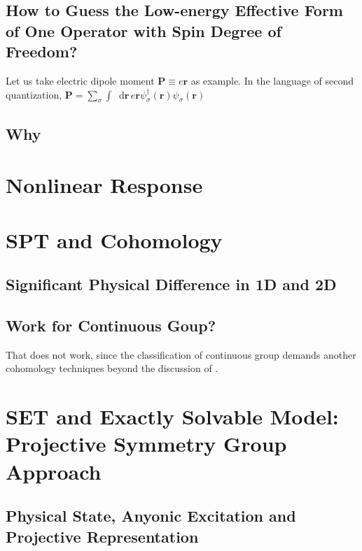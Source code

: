 \documentclass[10pt,nofootinbib]{revtex4}
\newcommand*\dd{\mathop{}\!\mathrm{d}}
\begin{document}
	\subsection{How to Guess the Low-energy Effective Form of One Operator with Spin Degree of Freedom?}
		Let us take electric dipole moment $\bm{P}\equiv e\bm{r}$ as example. In the language of second quantization, $\bm{P}=\sum_\sigma\int\dd\bm{r}\,e\bm{r}\psi_\sigma^\dagger(\bm{r})\psi_\sigma(\bm{r})$
	\subsection{Why}

\section{Nonlinear Response}
	\subsection{}

\section{SPT and Cohomology}
	\subsection{Significant Physical Difference in 1D and 2D}

	\subsection{Work for Continuous Goup?}
		That does not work, since the classification of continuous group demands another cohomology techniques beyond the discussion of \cite{chen2013symmetry}.

\section{SET and Exactly Solvable Model: Projective Symmetry Group Approach}
	\subsection{Physical State, Anyonic Excitation and Projective Representation}
\end{document}
